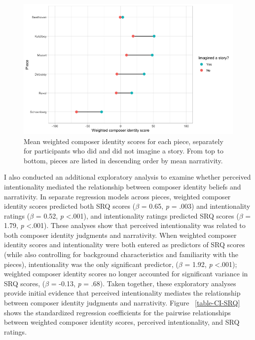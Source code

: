 \documentclass[12pt,twoside]{reedthesis}
\begin{document}
\begin{figure}[h!tbp]
	\centering
	\includegraphics[scale=0.5]{CI_differences.png}
	\caption{Mean weighted composer identity scores for each piece, separately for participants who did and did not imagine a story. From top to bottom, pieces are listed in descending order by mean narrativity.}
	\label{fig-ci-differences}
\end{figure}

I also conducted an additional exploratory analysis to examine whether perceived intentionality mediated the relationship between composer identity beliefs and narrativity. In separate regression models across pieces, weighted composer identity scores predicted both SRQ scores ($\beta$ = 0.65, \emph{p} = .003) and intentionality ratings ($\beta$ = 0.52, \emph{p}  \textless .001), and intentionality ratings predicted SRQ scores ($\beta$ = 1.79, \emph{p} \textless .001). These analyses show that perceived intentionality was related to both composer identity judgments and narrativity. When weighted composer identity scores and intentionality were both entered as predictors of SRQ scores (while also controlling for background characteristics and familiarity with the pieces), intentionality was the only significant predictor, ($\beta$ = 1.92, \emph{p} \textless .001); weighted composer identity scores no longer accounted for significant variance in SRQ scores, ($\beta$ = -0.13, \emph{p} = .68). Taken together, these exploratory analyses provide initial evidence that perceived intentionality mediates the relationship between composer identity judgments and narrativity. Figure ~\ref*{table-CI-SRQ} shows the standardized regression coefficients for the pairwise relationships between weighted composer identity scores, perceived intentionality, and SRQ ratings.
\end{document}

